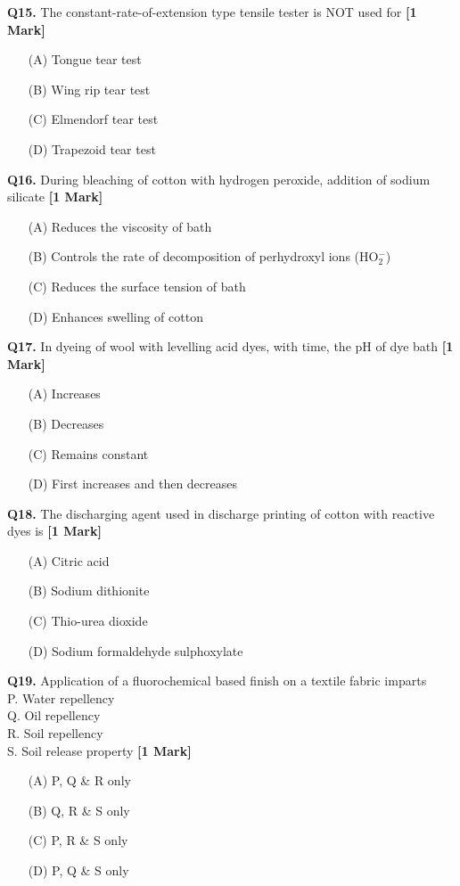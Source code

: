 \documentclass[11pt]{article}
\newcommand{\questiona}[2]{
    \noindent\textbf{Q#2.} #1 \hfill \textbf{[1 Mark]}
}
\begin{document}
\questiona{The constant-rate-of-extension type tensile tester is NOT used for}{15}
\begin{enumerate}
    \item[(A)] Tongue tear test
    \item[(B)] Wing rip tear test
    \item[(C)] Elmendorf tear test
    \item[(D)] Trapezoid tear test
\end{enumerate}
\vspace{0.5cm}

\questiona{During bleaching of cotton with hydrogen peroxide, addition of sodium silicate}{16}
\begin{enumerate}
    \item[(A)] Reduces the viscosity of bath
    \item[(B)] Controls the rate of decomposition of perhydroxyl ions (HO\(_2^-\))
    \item[(C)] Reduces the surface tension of bath
    \item[(D)] Enhances swelling of cotton
\end{enumerate}
\vspace{0.5cm}

\questiona{In dyeing of wool with levelling acid dyes, with time, the pH of dye bath}{17}
\begin{enumerate}
    \item[(A)] Increases
    \item[(B)] Decreases
    \item[(C)] Remains constant
    \item[(D)] First increases and then decreases
\end{enumerate}
\vspace{0.5cm}

\questiona{The discharging agent used in discharge printing of cotton with reactive dyes is}{18}
\begin{enumerate}
    \item[(A)] Citric acid
    \item[(B)] Sodium dithionite
    \item[(C)] Thio-urea dioxide
    \item[(D)] Sodium formaldehyde sulphoxylate
\end{enumerate}
\vspace{0.5cm}

\questiona{Application of a fluorochemical based finish on a textile fabric imparts \\
P. Water repellency \\
Q. Oil repellency \\
R. Soil repellency \\
S. Soil release property}{19}
\begin{enumerate}
    \item[(A)] P, Q \& R only
    \item[(B)] Q, R \& S only
    \item[(C)] P, R \& S only
    \item[(D)] P, Q \& S only
\end{enumerate}
\vspace{0.5cm}
\end{document}
